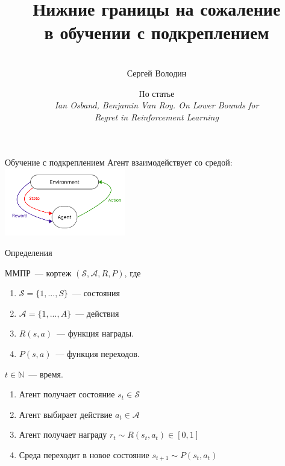 \documentclass{beamer}
\title[\hbox to 56mm{Обучение с подкреплением  \hfill\insertframenumber\,/\,\inserttotalframenumber}]
{Нижние границы на сожаление\\ в обучении с подкреплением}
\author[Сергей Володин]{\large \\Сергей Володин}
\institute{\large МФТИ}
\date{По статье\\ {\em Ian Osband, Benjamin Van Roy. On Lower Bounds for\\ Regret in Reinforcement Learning}}
\newcommand{\N}{\mathbb{N}}
\newcommand{\Ss}{\mathcal{S}}
\newcommand{\A}{\mathcal{A}}
\begin{document}
\begin{frame}
\titlepage
\end{frame}
\begin{frame}{Обучение с подкреплением}
\centering Агент взаимодействует со средой:
\includegraphics[width=200px]{RL.png}
\end{frame}

\begin{frame}{Определения}
\begin{definition}
	
	ММПР~--- кортеж $(\mathcal{S}, \mathcal{A}, R, P)$, где
	\begin{enumerate}
		\item $\mathcal{S}=\{1,...,S\}$~--- состояния
		\item $\mathcal{A}=\{1,...,A\}$~--- действия
		\item $R(s,a)$~--- функция награды.
		\item $P(s,a)$~--- функция переходов.
	\end{enumerate}
\end{definition}
\begin{definition}
	$t\in\N$~--- время.
	\begin{enumerate}
		\item Агент получает состояние $s_t\in \Ss$
		\item Агент выбирает действие $a_t\in\A$
		\item Агент получает награду $r_t\sim R(s_t,a_t)\in[0,1]$
		\item Среда переходит в новое состояние $s_{t+1}\sim P(s_t,a_t)$
	\end{enumerate}
\end{definition}
\end{frame}
\end{document}
